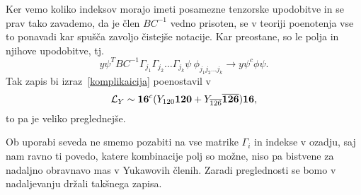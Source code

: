 Ker vemo koliko indeksov morajo imeti posamezne tenzorske upodobitve in se prav tako zavademo, da
je člen $BC^{-1}$ vedno prisoten, se v teoriji poenotenja vse to ponavadi kar spušča zavoljo čistejše
notacije. Kar preostane, so le polja in njihove upodobitve, tj.
\begin{equation}
	y \psi^TBC^{-1}\Gamma_{j_1}\Gamma_{j_2}\dots\Gamma_{j_k}\psi\ \phi_{j_1j_2\dots j_k}
		\to y\psi^c\phi\psi.
\end{equation}
Tak zapis bi izraz~\eqref{komplikaicija} poenostavil v
\begin{equation}
	\mathcal{L}_Y \sim \mathbf{16}^c (Y_{120}\mathbf{120} + Y_{\overline{126}}\overline{\mathbf{126}})\mathbf{16},
\end{equation}
to pa je veliko preglednejše. 

Ob uporabi seveda ne smemo pozabiti na vse matrike $\Gamma_i$ in indekse v ozadju, saj nam ravno ti
povedo, katere kombinacije polj so možne, niso pa bistvene za nadaljno obravnavo mas v Yukawovih
členih. Zaradi preglednosti se bomo v nadaljevanju držali takšnega zapisa.






































